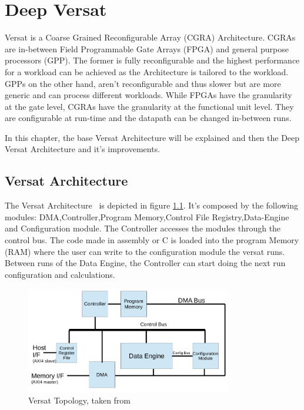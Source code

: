 \chapter{Deep Versat}
\label{chapter:DeepVersat}

\quad Versat is a Coarse Grained Reconfigurable Array (CGRA) Architecture. CGRAs are in-between Field Programmable Gate Arrays (FPGA) and general purpose processors (GPP).
The former is fully reconfigurable and the highest performance for a workload can be achieved as the Architecture is tailored to the workload.
GPPs on the other hand, aren't reconfigurable and thus slower but are more generic and can process different workloads.
While FPGAs have the granularity at the gate level, CGRAs have the granularity at the functional unit level. They are configurable at run-time and the datapath can be
changed in-between runs.   

In this chapter, the base Versat Architecture will be explained and then the Deep Versat Architecture
 and it's improvements.

\section{Versat Architecture}

\quad The Versat Architecture~\cite{sousa:compiler,sousa:controller,sousa:FFT,sousa:versat2016} 
is depicted in figure \ref{figure:oldversat}. It's composed by the following modules: DMA,Controller,Program Memory,Control File Registry,Data-Engine and Configuration module.
The Controller accesses the modules through the control bus. The code made in assembly or C is loaded into the program Memory (RAM) where the user
can write to the configuration module the versat runs. Between runs of the Data Engine,
 the Controller can start doing the next run configuration and calculations.


\begin{figure}[!htbp]
    \centering
    \includegraphics[width=0.8\textwidth]{Figures/top.png}
    \caption{Versat Topology, taken from~\cite{sousa:controller}}
    \label{figure:oldversat}
\end{figure} 

